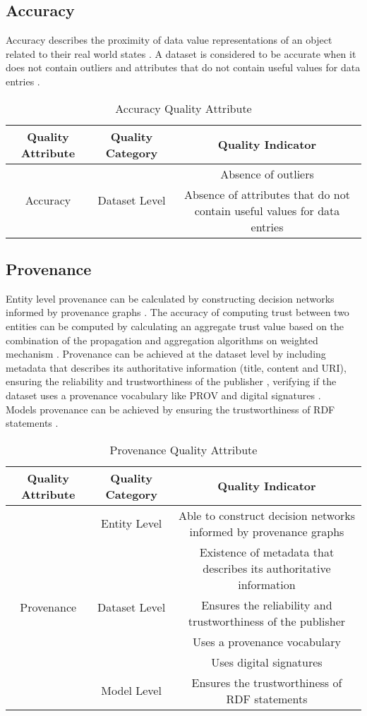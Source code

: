 \documentclass[onecolumn, crcready]{iosart2c}
\begin{document}
\subsection{Accuracy}

Accuracy describes the proximity of data value representations of an object related to their real world states \cite{Furber2011a}. A dataset is considered to be accurate when it does not contain outliers and attributes that do not contain useful values for data entries \cite{Framework2012}.
\begin{table}[h]
\begin{tabular}{|c|c|c|}
\hline 
Quality Attribute & Quality Category & Quality Indicator\tabularnewline
\hline 
\hline 
\multirow{2}{*}{Accuracy} & \multirow{2}{*}{Dataset Level} & Absence of outliers\tabularnewline
\cline{3-3} 
 &  & Absence of attributes that do not contain useful values for data entries\tabularnewline
\hline 
\end{tabular}\caption{Accuracy Quality Attribute}
\end{table}

\subsection{Provenance}

Entity level provenance can be calculated by constructing decision networks informed by provenance graphs \cite{Gamble2011}. The accuracy of computing trust between two entities \cite{Framework2012} can be computed by calculating an aggregate trust value based on the combination of the propagation and aggregation algorithms on weighted mechanism \cite{j.websem208}. Provenance can be achieved at the dataset level by including metadata that describes its authoritative information (title, content and URI), ensuring the reliability and trustworthiness of the publisher \cite{Flouris2012}, verifying if the dataset uses a provenance vocabulary like PROV \cite{w3c-prov-o} and digital signatures \cite{Framework2012}. \\ Models provenance can be achieved by ensuring the trustworthiness of RDF statements \cite{Hartig09usingweb}. 

\begin{table}[h]
\begin{tabular}{|c|c|c|}
\hline 
Quality Attribute & Quality Category & Quality Indicator\tabularnewline
\hline 
\multirow{6}{*}{Provenance} & \multirow{1}{*}{Entity Level} & Able to construct decision networks informed by provenance graphs\tabularnewline
\cline{2-3} 
 & \multirow{4}{*}{Dataset Level} & Existence of metadata that describes its authoritative information\tabularnewline
\cline{3-3} 
 &  & Ensures the reliability and trustworthiness of the publisher\tabularnewline
\cline{3-3} 
 &  & Uses a provenance vocabulary\tabularnewline
\cline{3-3} 
 &  & Uses digital signatures\tabularnewline
\cline{2-3} 
 & \multirow{1}{*}{Model Level} & Ensures the trustworthiness of RDF statements\tabularnewline
\hline 
\end{tabular}\caption{Provenance Quality Attribute}
\end{table}
\end{document}
